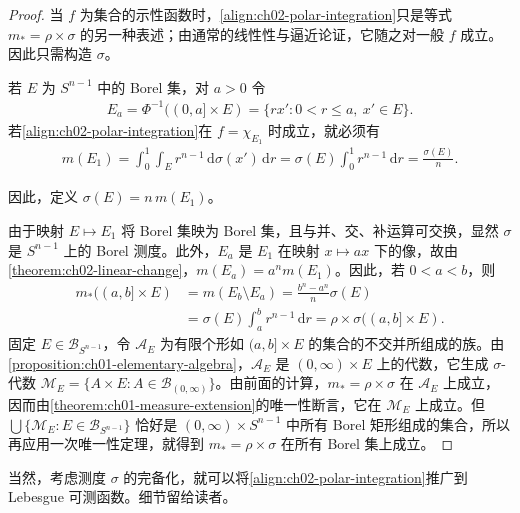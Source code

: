 \documentclass[../../main.tex]{subfiles}%
\begin{document}
\begin{proof}
当 $f$ 为集合的示性函数时，\eqref{align:ch02-polar-integration}只是等式 $m_*=\rho\times\sigma$ 的另一种表述；由通常的线性性与逼近论证，它随之对一般 $f$ 成立。因此只需构造 $\sigma$。

若 $E$ 为 $S^{n-1}$ 中的 Borel 集，对 $a>0$ 令
\begin{align*}
E_a=\Phi^{-1}((0,a]\times E)=\{rx':0<r\le a,\ x'\in E\}.
\end{align*}
若\eqref{align:ch02-polar-integration}在 $f=\chi_{E_1}$ 时成立，就必须有
\begin{align*}
m(E_1)=\int_0^1\int_E r^{n-1}\,\mathrm{d}\sigma(x')\,\mathrm{d}r
=\sigma(E)\int_0^1r^{n-1}\,\mathrm{d}r=\frac{\sigma(E)}n.
\end{align*}
\begin{definition*}[球面测度的构造]
因此，定义 $\sigma(E)=n\,m(E_1)$。
\end{definition*}
由于映射 $E\mapsto E_1$ 将 Borel 集映为 Borel 集，且与并、交、补运算可交换，显然 $\sigma$ 是 $S^{n-1}$ 上的 Borel 测度。此外，$E_a$ 是 $E_1$ 在映射 $x\mapsto ax$ 下的像，故由\cref{theorem:ch02-linear-change}，$m(E_a)=a^nm(E_1)$。因此，若 $0<a<b$，则
\begin{align*}
m_*((a,b]\times E)&=m(E_b\setminus E_a)=\frac{b^n-a^n}{n}\sigma(E)\\
&=\sigma(E)\int_a^b r^{n-1}\,\mathrm{d}r=\rho\times\sigma((a,b]\times E).
\end{align*}
固定 $E\in\mathscr{B}_{S^{n-1}}$，令 $\mathscr{A}_E$ 为有限个形如 $(a,b]\times E$ 的集合的不交并所组成的族。由\cref{proposition:ch01-elementary-algebra}，$\mathscr{A}_E$ 是 $(0,\infty)\times E$ 上的代数，它生成 $\sigma$-代数 $\mathscr{M}_E=\{A\times E:A\in\mathscr{B}_{(0,\infty)}\}$。由前面的计算，$m_*=\rho\times\sigma$ 在 $\mathscr{A}_E$ 上成立，因而由\cref{theorem:ch01-measure-extension}的唯一性断言，它在 $\mathscr{M}_E$ 上成立。但 $\bigcup\{\mathscr{M}_E:E\in\mathscr{B}_{S^{n-1}}\}$ 恰好是 $(0,\infty)\times S^{n-1}$ 中所有 Borel 矩形组成的集合，所以再应用一次唯一性定理，就得到 $m_*=\rho\times\sigma$ 在所有 Borel 集上成立。
\end{proof}
\begin{remark}
当然，考虑测度 $\sigma$ 的完备化，就可以将\eqref{align:ch02-polar-integration}推广到 Lebesgue 可测函数。细节留给读者。
\end{remark}
\end{document}
